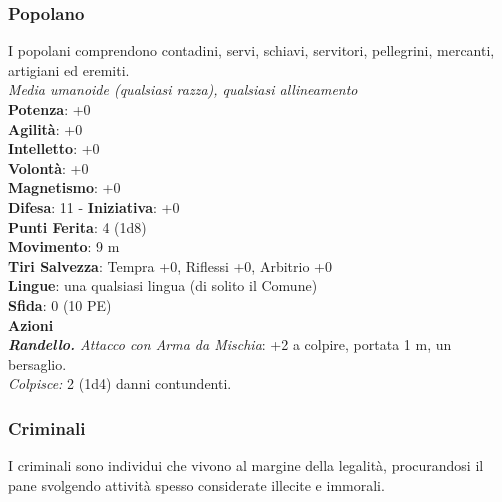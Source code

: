 \begin{multicols}{2}
\subsubsection{Popolano}
I popolani comprendono contadini, servi, schiavi, servitori, pellegrini, mercanti, artigiani ed eremiti.\\
\emph{Media umanoide (qualsiasi razza), qualsiasi allineamento}\\
\textbf{Potenza}: +0\\
\textbf{Agilità}: +0\\
\textbf{Intelletto}: +0\\
\textbf{Volontà}: +0\\
\textbf{Magnetismo}: +0\\
\textbf{Difesa}: 11 - \textbf{Iniziativa}: +0\\
\textbf{Punti Ferita}: 4 (1d8)\\
\textbf{Movimento}: 9 m\\
\textbf{Tiri Salvezza}: Tempra +0, Riflessi +0, Arbitrio +0 \\
\textbf{Lingue}: una qualsiasi lingua (di solito il Comune)\\
\textbf{Sfida}: 0 (10 PE)\smallskip\\
\smallskip\textbf{Azioni}\\
\emph{\textbf{Randello.} Attacco con Arma da Mischia}: +2 a colpire, portata 1 m, un bersaglio.\\
\emph{Colpisce:} 2 (1d4) danni contundenti.\\

\subsubsection{Criminali}

I criminali sono individui che vivono al margine della legalità, procurandosi il pane svolgendo attività spesso considerate illecite e immorali.\\


\end{multicols}
